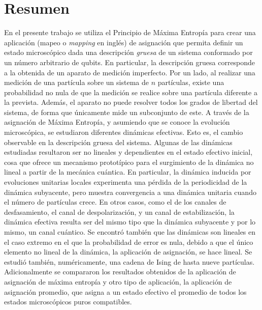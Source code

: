 \section*{Resumen}

En el presente trabajo se utiliza el Principio de Máxima Entropía para crear una aplicación (mapeo o \textit{mapping} en inglés) de asignación que permita definir un estado microscópico dada una descripción \textit{gruesa} de un sistema conformado por un número arbitrario de qubits. En particular, la descripción gruesa corresponde a la obtenida de un aparato de medición imperfecto. Por un lado, al realizar una medición de una partícula sobre un sistema de $n$ partículas, existe una probabilidad no nula de que la medición se realice sobre una partícula diferente a la prevista. Además, el aparato no puede resolver todos los grados de libertad del sistema, de forma que únicamente mide un subconjunto de este. A través de la asignación de Máxima Entropía, y asumiendo que se conoce la evolución microscópica, se estudiaron diferentes dinámicas efectivas. Esto es, el cambio observable en la descripción gruesa del sistema. Algunas de las dinámicas estudiadas resultaron ser no lineales y dependientes en el estado efectivo inicial, cosa que ofrece un mecanismo prototípico para el surgimiento de la dinámica no lineal a partir de la mecánica cuántica. En particular, la dinámica inducida por evoluciones unitarias locales experimenta una pérdida de la periodicidad de la dinámica subyacente, pero muestra convergencia a una dinámica unitaria cuando el número de partículas crece. En otros casos, como el de los canales de desfasamiento, el canal de despolarización, y un canal de estabilización, la dinámica efectiva resulta ser del mismo tipo que la dinámica subyacente y por lo mismo, un canal cuántico. Se encontró también que las dinámicas son lineales en el caso extremo en el que la probabilidad de error es nula, debido a que el único elemento no lineal de la dinámica, la aplicación de asignación, se hace lineal. Se estudió también, numéricamente, una cadena de Ising de hasta nueve partículas. Adicionalmente se compararon los resultados obtenidos de la aplicación de asignación de máxima entropía y otro tipo de aplicación, la aplicación de asignación promedio, que asigna a un estado efectivo el promedio de todos los estados microscópicos puros compatibles.
